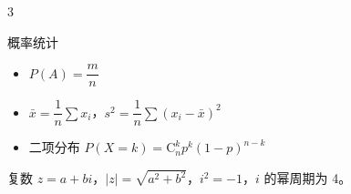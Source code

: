 \begin{multicols}{3}
\begin{fastcard}{概率统计}
\begin{itemize}[leftmargin=1.2em, topsep=0.2ex, itemsep=0.1ex, parsep=0pt]
\item $P(A)=\dfrac{m}{n}$
\item $\bar x=\dfrac1n\sum x_i$，$s^2=\dfrac1n\sum(x_i-\bar x)^2$
\item 二项分布 $P(X=k)=\mathrm C_n^k p^k(1-p)^{n-k}$
\end{itemize}
\end{fastcard}

\begin{fastcard}{复数}
$z=a+bi$，$|z|=\sqrt{a^2+b^2}$，$i^2=-1$，$i$ 的幂周期为 4。
\end{fastcard}

\end{multicols}
